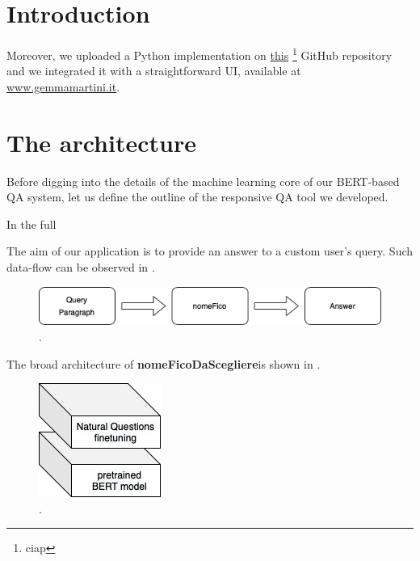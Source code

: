 \documentclass[12pt,a4paper,hidelinks]{article}
\newcommand{\nomefico}{\textbf{nomeFicoDaScegliere}}
\begin{document}

\newpage
\setcounter{page}{1}

\section{Introduction}\label{sec:intro}

Moreover, we uploaded a Python implementation on \href{cia}{this} \footnote{ciap} GitHub repository and we integrated it with a straightforward UI, available at \href{www.gemmamartini.it}{www.gemmamartini.it}.



\section{The architecture}\label{sec:model}
Before digging into the details of the machine learning core of our BERT-based QA system, let us define the outline of the responsive QA tool we developed.

In  the full

The aim of our application is to provide an answer to a custom user's query. Such data-flow can be observed in .

\begin{figure}[ht!]
    \centering
    \includegraphics[width=\textwidth]{report/pics/application_dataflow.png}
    \caption{.}
    \label{fig:application_dataflow}
\end{figure}

The broad architecture of \nomefico is shown in .

\begin{figure}[ht!]
    \centering
    \includegraphics[scale=.9]{pics/broad_architecture.png}
    \caption{.}
    \label{fig:broad_architecture}
\end{figure}
\end{document}
